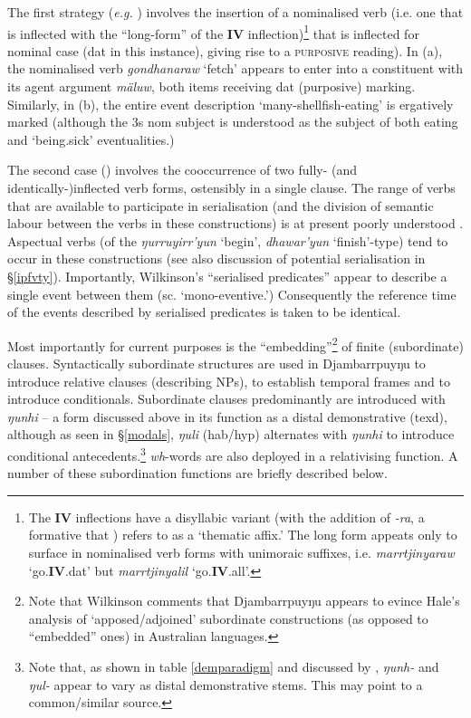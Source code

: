 The first strategy (\textit{e.g.} ) involves the insertion of a nominalised verb (i.e. one that is inflected with the ``long-form'' of the \textbf{IV} inflection)\footnote{The \textbf{IV} inflections have a disyllabic variant (with the addition of \textit{-ra}, a formative that \cite[4]{Wilkinson-ms}) refers to as a `thematic affix.' The long form appeats only to surface in nominalised verb forms with unimoraic suffixes, i.e. \textit{marrtjinyaraw} `go.\textbf{IV}.\gls{dat}' but \textit{marrtjinyalil} `go.\textbf{IV}.\gls{all}'.} that is inflected for nominal case (\gls{dat} in this instance), giving rise to a \textsc{purposive} reading). In (a), the nominalised verb \textit{gondhanaraw} `fetch' appears to enter into a constituent with its agent argument \textit{mäluw}, both items receiving \gls{dat} (purposive) marking. Similarly, in (b), the entire event description `many-shellfish-eating' is ergatively marked (although the 3s \gls{nom} subject is understood as the subject of both eating and `being.sick' eventualities.)

The second case () involves the cooccurrence of two fully- (and identically-)inflected verb forms, ostensibly in a single clause. The range of verbs that are available to participate in serialisation (and the division of semantic labour between the verbs in these constructions) is at present poorly understood \citep[see][27ff]{Wilkinson-ms}. Aspectual verbs (of the \textit{ŋurruyirr'yun} `begin', \textit{dhawar'yun} `finish'-type) tend to occur in these constructions (see also discussion of potential serialisation in §\ref{ipfvty}). Importantly, Wilkinson's ``serialised predicates'' appear to describe a single event between them (sc. `mono-eventive.') Consequently the reference time of the events described by serialised predicates is taken to be identical.

Most importantly for current purposes is the ``embedding''\footnote{Note that Wilkinson comments \citeyearpar[656]{Wilkinson1991} that Djambarrpuyŋu appears to evince Hale's \citeyearpar{Hale1976} analysis of `apposed/adjoined' subordinate constructions (as opposed to ``embedded'' ones) in Australian languages.} of finite (subordinate) clauses. Syntactically subordinate structures are used in Djambarrpuyŋu to introduce relative clauses (describing NPs), to establish temporal frames and to introduce conditionals. Subordinate clauses predominantly are introduced with \textit{ŋunhi} -- a form discussed above in its function as a distal demonstrative (\gls{texd}), although as seen in §\ref{modals}, \textit{ŋuli} (\gls{hab}/\gls{hyp}) alternates with \textit{ŋunhi} to introduce conditional antecedents.\footnote{Note that, as shown in table \ref{demparadigm} and discussed by \citet[254??]{Wilkinson1991}, \textit{ŋunh-} and \textit{ŋul-} appear to vary as distal demonstrative stems. This may point to a common/similar source.} \textit{wh}-words are also deployed in a relativising function. A number of these subordination functions are briefly described below.  %

